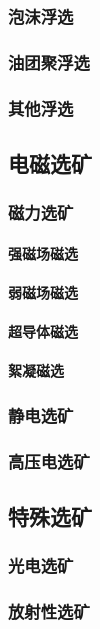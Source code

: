 \documentclass[UTF8]{../../ApplicationUniverse}
\begin{document}
        \subsubsection{泡沫浮选}
        \subsubsection{油团聚浮选}
        \subsubsection{其他浮选}
    \subsection{电磁选矿}
        \subsubsection{磁力选矿}
            \paragraph{强磁场磁选}
            \paragraph{弱磁场磁选}
            \paragraph{超导体磁选}
            \paragraph{絮凝磁选}
        \subsubsection{静电选矿}
        \subsubsection{高压电选矿}
    \subsection{特殊选矿}
        \subsubsection{光电选矿}
        \subsubsection{放射性选矿}
\end{document}
